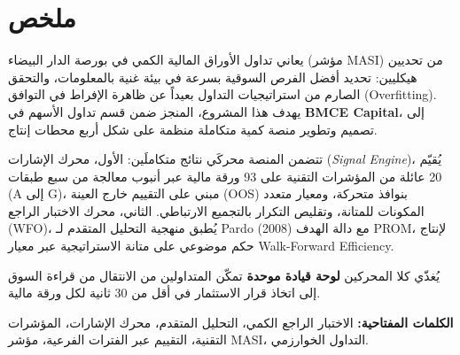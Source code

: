 \chapter*{\texorpdfstring{\textarabic{ملخص}}{Molakhas}}
\thispagestyle{plain}

\begin{Arabic}
\begin{flushright}
\setlength{\parindent}{0pt}

يعاني تداول الأوراق المالية الكمي في بورصة الدار البيضاء (مؤشر MASI) من تحديين هيكليين:
تحديد أفضل الفرص السوقية بسرعة في بيئة غنية بالمعلومات، والتحقق الصارم من استراتيجيات
التداول بعيداً عن ظاهرة الإفراط في التوافق (Overfitting).
يهدف هذا المشروع، المنجز ضمن قسم تداول الأسهم في \textbf{BMCE Capital}،
إلى تصميم وتطوير منصة كمية متكاملة منظمة على شكل أربع محطات إنتاج.

\medskip

تتضمن المنصة محركَي نتائج متكاملَين:
الأول، محرك الإشارات (\textit{Signal Engine})، يُقيّم 20 عائلة من المؤشرات التقنية
على 93 ورقة مالية عبر أنبوب معالجة من سبع طبقات (A إلى G)،
مبني على التقييم خارج العينة (OOS) بنوافذ متحركة، ومعيار متعدد المكونات للمتانة،
وتقليص التكرار بالتجميع الارتباطي.
الثاني، محرك الاختبار الراجع (WFO)، يُطبق منهجية التحليل المتقدم لـ Pardo (2008)
مع دالة الهدف PROM، لإنتاج حكم موضوعي على متانة الاستراتيجية عبر معيار Walk-Forward Efficiency.

\medskip

يُغذّي كلا المحركين \textbf{لوحة قيادة موحدة} تمكّن المتداولين من الانتقال
من قراءة السوق إلى اتخاذ قرار الاستثمار في أقل من 30 ثانية لكل ورقة مالية.

\bigskip
\noindent\textbf{الكلمات المفتاحية:}
الاختبار الراجع الكمي، التحليل المتقدم، محرك الإشارات، المؤشرات التقنية،
التقييم عبر الفترات الفرعية، مؤشر MASI، التداول الخوارزمي.

\end{flushright}
\end{Arabic}
